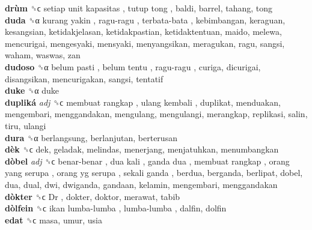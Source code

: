 \textbf{drùm} ␝ϲ   setiap unit kapasitas ,  tutup tong , baldi, barrel, tahang, tong  \\
\textbf{duda} ␝α   kurang yakin ,  ragu-ragu ,  terbata-bata , kebimbangan, keraguan, kesangsian, ketidakjelasan, ketidakpastian, ketidaktentuan, maido, melewa, mencurigai, mengesyaki, mensyaki, menyangsikan, meragukan, ragu, sangsi, waham, waswas, zan  \\
\textbf{dudoso} ␝α   belum pasti ,  belum tentu ,  ragu-ragu , curiga, dicurigai, disangsikan, mencurigakan, sangsi, tentatif  \\
\textbf{duke} ␝α  duke  \\
\textbf{dupliká} \emph{adj}  ␝ϲ   membuat rangkap ,  ulang kembali , duplikat, menduakan, mengembari, menggandakan, mengulang, mengulangi, merangkap, replikasi, salin, tiru, ulangi  \\
\textbf{dura} ␝α  berlangsung, berlanjutan, berterusan  \\
\textbf{dèk} ␝ϲ  dek, geladak, melindas, menerjang, menjatuhkan, menumbangkan  \\
\textbf{dòbel} \emph{adj}  ␝ϲ   benar-benar ,  dua kali ,  ganda dua ,  membuat rangkap ,  orang yang serupa ,  orang yg serupa ,  sekali ganda , berdua, berganda, berlipat, dobel, dua, dual, dwi, dwiganda, gandaan, kelamin, mengembari, menggandakan  \\
\textbf{dòkter} ␝ϲ   Dr , dokter, doktor, merawat, tabib  \\
\textbf{dòlfein} ␝ϲ   ikan lumba-lumba ,  lumba-lumba , dalfin, dolfin  \\
\textbf{edat} ␝ϲ  masa, umur, usia  \\
